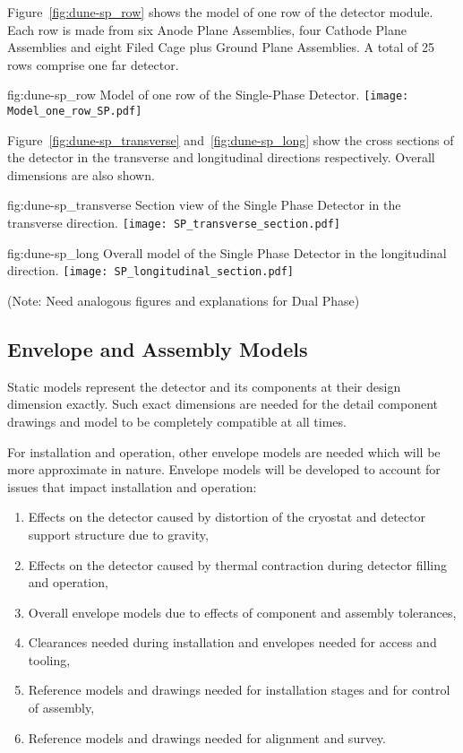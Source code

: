 Figure~\ref{fig:dune-sp_row} shows the model of one row of the
detector module. Each row is made from six Anode Plane Assemblies,
four Cathode Plane Assemblies and eight Filed Cage plus Ground Plane
Assemblies. A total of 25 rows comprise one  far detector.
\begin{dunefigure}{fig:dune-sp_row}
  {Model of one row of the Single-Phase Detector.}
  \texttt{[image: Model\_one\_row\_SP.pdf]}
\end{dunefigure}


Figure~\ref{fig:dune-sp_transverse} and~\ref{fig:dune-sp_long} show
the cross sections of the detector in the transverse and longitudinal
directions respectively. Overall dimensions are also shown.
\begin{dunefigure}{fig:dune-sp_transverse}
  {Section view of the Single Phase Detector in the transverse direction.}
  \texttt{[image: SP\_transverse\_section.pdf]}
\end{dunefigure}
\begin{dunefigure}{fig:dune-sp_long}
  {Overall model of the Single Phase Detector in the longitudinal direction.}
  \texttt{[image: SP\_longitudinal\_section.pdf]}
\end{dunefigure}

(Note: Need analogous figures and explanations for Dual Phase)

\subsection{Envelope and Assembly Models}
\label{sec:fdsp-coord-integ-envelope}
Static models represent the detector and its components at their
design dimension exactly. Such exact dimensions are needed for the
detail component drawings and model to be completely compatible at all
times.

For installation and operation, other envelope models are needed which
will be more approximate in nature. Envelope models will be developed
to account for issues that impact installation and operation:
\begin{enumerate}
 \item Effects on the detector caused by distortion of the cryostat
   and detector support structure due to gravity,
 \item Effects on the detector caused by thermal contraction during
   detector filling and operation,
 \item Overall envelope models due to effects of component and
   assembly tolerances,
 \item Clearances needed during installation and envelopes needed for
   access and tooling,
 \item Reference models and drawings needed for installation stages
   and for control of assembly,
 \item Reference models and drawings needed for alignment and survey.
\end{enumerate}


